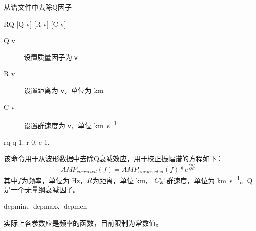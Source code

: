 \label{cmd:rq}

从谱文件中去除Q因子

\begin{SACSTX}
RQ [Q v] [R v] [C v]
\end{SACSTX}

\begin{description}
\item [Q v] 设置质量因子为 \texttt{v}
\item [R v] 设置距离为 \texttt{v}，单位为 \si{\km}
\item [C v] 设置群速度为 \texttt{v}，单位 \si{\km\per\s}
\end{description}

\begin{SACDFT}
rq q 1. r 0. c 1.
\end{SACDFT}

该命令用于从波形数据中去除Q衰减效应，用于校正振幅谱的方程如下：
\[ AMP_{corrected}(f) = AMP_{uncorrected}(f) * e^{\frac{\pi R f}{Q C}} \]
其中$f$为频率，单位为 \si{\Hz}，$R$为距离，单位 \si{\km}，
$C$是群速度，单位为 \si{\km\per\s}。Q是一个无量纲衰减因子。

depmin、depmax、depmen

实际上各参数应是频率的函数，目前限制为常数值。

